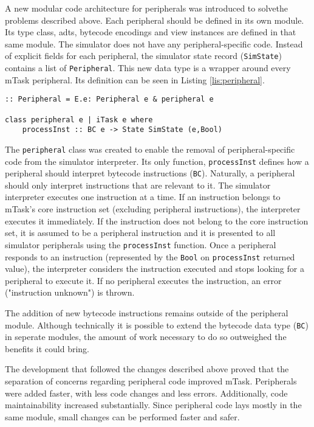 A new modular code architecture for peripherals was introduced to solvethe problems described above. Each peripheral should be defined in its own module. Its type class, \acsp{adt}, bytecode encodings and view instances are defined in that same module. The simulator does not have any peripheral-specific code. Instead of explicit fields for each peripheral, the simulator state record (\texttt{SimState}) contains a list of \texttt{Peripheral}. This new data type is a wrapper around every \gls{mTask} peripheral. Its definition can be seen in Listing \ref{lis:peripheral}. 

\begin{lstlisting}[caption=The \texttt{Peripheral} class,captionpos=b,label=lis:peripheral]
:: Peripheral = E.e: Peripheral e & peripheral e

class peripheral e | iTask e where
	processInst :: BC e -> State SimState (e,Bool)
\end{lstlisting}

The \texttt{peripheral} class was created to enable the removal of peripheral-specific code from the simulator interpreter. Its only function, \texttt{processInst} defines how a peripheral should interpret bytecode instructions (\texttt{BC}). Naturally, a peripheral should only interpret instructions that are relevant to it. The simulator interpreter executes one instruction at a time. If an instruction belongs to \gls{mTask}'s core instruction set (excluding peripheral instructions), the interpreter executes it immediately. If the instruction does not belong to the core instruction set, it is assumed to be a peripheral instruction and it is presented to all simulator peripherals using the \texttt{processInst} function. Once a peripheral responds to an instruction (represented by the \texttt{Bool} on \texttt{processInst} returned value), the interpreter considers the instruction executed and stops looking for a peripheral to execute it. If no peripheral executes the instruction, an error ("instruction unknown") is thrown. 

The addition of new bytecode instructions remains outside of the peripheral module. Although technically it is possible to extend the bytecode data type (\texttt{BC}) in seperate modules, the amount of work necessary to do so outweighed the benefits it could bring. 

The development that followed the changes described above proved that the separation of concerns regarding peripheral code improved \gls{mTask}. Peripherals were added faster, with less code changes and less errors. Additionally, code maintainability increased substantially. Since peripheral code lays mostly in the same module, small changes can be performed faster and safer.

